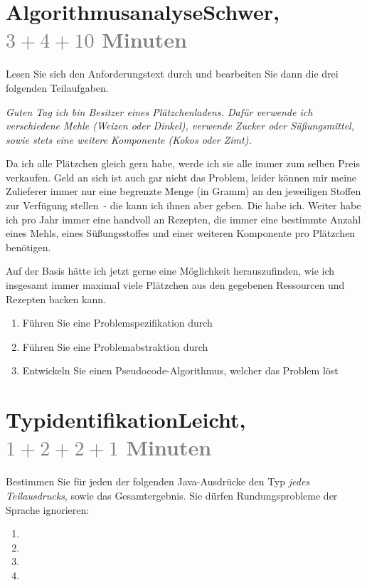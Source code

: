 \documentclass[table]{sopra-base}
\def\TaskBlock(#1)[#2]#3{\section[#3]{#3\hfill{\small\textcolor{paletteA!80!white}{#1}, \textcolor{gray}{#2 Minuten}}}}
\begin{document}
\clearpage
\TaskBlock(Schwer)[\(3+4+10\)]{Algorithmusanalyse}
Lesen Sie sich den Anforderungstext durch und bearbeiten Sie dann die drei folgenden Teilaufgaben.

{\itshape{} Guten Tag ich bin Besitzer eines Plätzchenladens. Dafür verwende ich verschiedene Mehle (Weizen oder Dinkel), verwende Zucker oder Süßungsmittel, sowie stets eine weitere Komponente (Kokos oder Zimt).

Da ich alle Plätzchen gleich gern habe, werde ich sie alle immer zum selben Preis verkaufen.
Geld an sich ist auch gar nicht das Problem, leider können mir meine Zulieferer immer nur eine begrenzte Menge (in Gramm) an den jeweiligen Stoffen zur Verfügung stellen~- die kann ich ihnen aber geben. Die habe ich.
Weiter habe ich pro Jahr immer eine handvoll an Rezepten, die immer eine bestimmte Anzahl eines Mehls, eines Süßungsstoffes und einer weiteren Komponente pro Plätzchen benötigen.

Auf der Basis hätte ich jetzt gerne eine Möglichkeit herauszufinden, wie ich insgesamt immer maximal viele Plätzchen aus den gegebenen Ressourcen und Rezepten backen kann.}

\begin{enumerate}[label=\alph*)]
    \item Führen Sie eine Problemspezifikation durch\vfill
    \item Führen Sie eine Problemabstraktion durch\vfill
    \item Entwickeln Sie einen Pseudocode-Algorithmus, welcher das Problem löst\vfill\vfill\vfill
\end{enumerate}


\clearpage
\TaskBlock(Leicht)[\(1+2+2+1\)]{Typidentifikation}

Bestimmen Sie für jeden der folgenden Java-Ausdrücke den Typ \textit{jedes Teilausdrucks}, sowie das Gesamtergebnis. Sie dürfen Rundungsprobleme der Sprache ignorieren:\vspace*{3em}
\begin{enumerate}[label=\alph*)]
    \itemsep8em
    \item {}
    \item {}
    \item {}
    \item {}
\end{enumerate}
\end{document}
